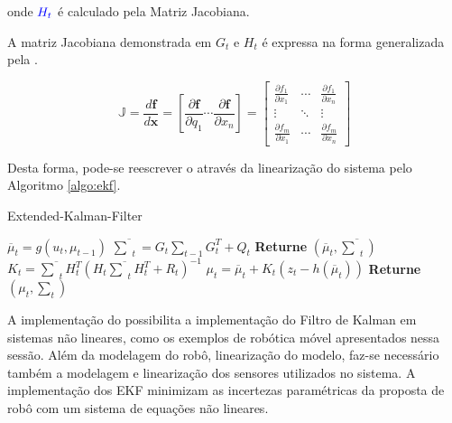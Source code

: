 \noindent onde $\color{blue}H_t$ é calculado pela Matriz Jacobiana.

A matriz Jacobiana demonstrada em $G_t$ e $H_t$ é expressa na forma generalizada pela .

\begin{equation}
    \label{eq:taylor5}
    \mathbb{J}
    =
    \frac{d \mathbf{f}}{d \mathbf{x}}
    =
    \left[ \frac{\partial \mathbf{f}}{\partial q_1}
        \cdots \frac{\partial \mathbf{f}}{\partial x_n} \right]
    =
    \begin{bmatrix}
        \frac{\partial f_1}{\partial x_1} & \cdots &
        \frac{\partial f_1}{\partial x_n}                   \\
        \vdots                            & \ddots & \vdots \\
        \frac{\partial f_m}{\partial x_1} & \cdots &
        \frac{\partial f_m}{\partial x_n}
    \end{bmatrix}
\end{equation}

Desta forma, pode-se reescrever o  através da linearização do sistema pelo Algoritmo \ref{algo:ekf}.

\begin{algorithm}[H]
    \caption{Extended-Kalman-Filter}
    \begin{algorithmic}[1]
        \State $\overline{\mu}_t = g(u_t, \mu_{t-1})$
        \State $ \overline{\textstyle\sum}_t = G_t {\textstyle\sum}_{t-1} G_t^T+ Q_t$ 
        \State \textbf{Returne} $\left(\overline{\mu}_t, \overline{\textstyle\sum}_t\right)$
    \EndProcedure
        \State $K_t = \overline{\textstyle\sum}_tH_t^T(H_t\overline{\textstyle\sum}_tH_t^T+R_t)^{-1}$
        \State $\mu_t  = \overline{\mu}_t + K_t(z_t -h(\overline\mu_t))$
        \State \textbf{Returne} $\left(\mu_t, \textstyle\sum_t\right)$
    \EndProcedure
    \end{algorithmic}
    \label{algo:ekf}
\end{algorithm}

A implementação do  possibilita a implementação do Filtro de Kalman em sistemas não lineares, como os exemplos de robótica móvel apresentados nessa sessão. Além da modelagem do robô, linearização do modelo, faz-se necessário também a modelagem e linearização dos sensores utilizados no sistema. A implementação dos EKF minimizam as incertezas paramétricas da proposta de robô com um sistema de equações não lineares.